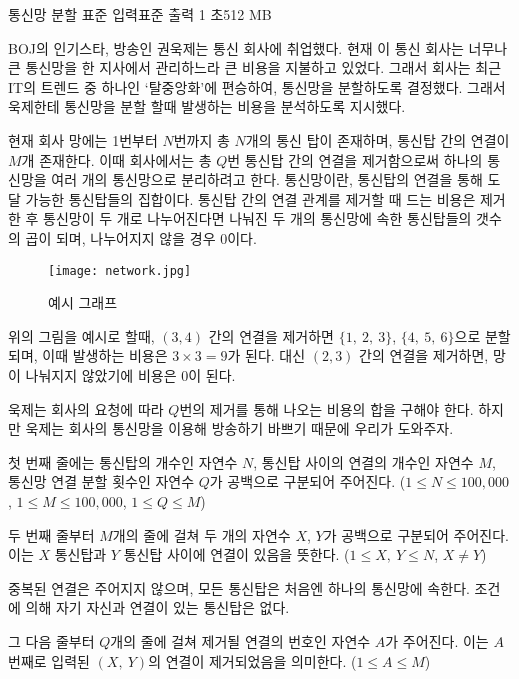 \begin{problem}{통신망 분할}
    {표준 입력}{표준 출력}
    {1 초}{512 MB}{}
    
    BOJ의 인기스타, 방송인 권욱제는 통신 회사에 취업했다. 현재 이 통신 회사는 너무나 큰 통신망을 한 지사에서 관리하느라 큰 비용을 지불하고 있었다. 그래서 회사는 최근 IT의 트렌드 중 하나인 `탈중앙화'에 편승하여, 통신망을 분할하도록 결정했다. 그래서 욱제한테 통신망을 분할 할때 발생하는 비용을 분석하도록 지시했다.

    현재 회사 망에는 1번부터 $ N $번까지 총 $ N $개의 통신 탑이 존재하며, 통신탑 간의 연결이 $ M $개 존재한다. 이때 회사에서는 총 $ Q $번 통신탑 간의 연결을 제거함으로써 하나의 통신망을 여러 개의 통신망으로 분리하려고 한다. 통신망이란, 통신탑의 연결을 통해 도달 가능한 통신탑들의 집합이다. 통신탑 간의 연결 관계를 제거할 때 드는 비용은 제거한 후 통신망이 두 개로 나누어진다면 나눠진 두 개의 통신망에 속한 통신탑들의 갯수의 곱이 되며, 나누어지지 않을 경우 0이다.
    
    \begin{figure}[h]
        \centering
        \texttt{[image: network.jpg]}
        \caption{예시 그래프}
    \end{figure}

    위의 그림을 예시로 할때, $ (3, 4)$ 간의 연결을 제거하면 $ \{1,\ 2,\ 3\} $, $ \{4,\ 5,\ 6\} $으로 분할 되며, 이때 발생하는 비용은 $ 3 \times 3 = 9 $가 된다. 대신 $ (2, 3) $ 간의 연결을 제거하면, 망이 나눠지지 않았기에 비용은 0이 된다.

    욱제는 회사의 요청에 따라 $ Q $번의 제거를 통해 나오는 비용의 합을 구해야 한다. 하지만 욱제는 회사의 통신망을 이용해 방송하기 바쁘기 때문에 우리가 도와주자.
    
    \InputFile
    
    첫 번째 줄에는 통신탑의 개수인 자연수 $ N $, 통신탑 사이의 연결의 개수인 자연수 $ M $, 통신망 연결 분할 횟수인 자연수 $ Q $가 공백으로 구분되어 주어진다. ($ 1 \leq N \leq 100,000 $, $ 1 \leq M \leq 100,000 $, $ 1 \leq Q \leq M $)
    
    두 번째 줄부터 $ M $개의 줄에 걸쳐 두 개의 자연수 $ X $, $ Y $가 공백으로 구분되어 주어진다. 이는 $ X $ 통신탑과 $ Y $ 통신탑 사이에 연결이 있음을 뜻한다. ($ 1 \leq X,\ Y \leq N $, $ X \neq Y $)
    
    중복된 연결은 주어지지 않으며, 모든 통신탑은 처음엔 하나의 통신망에 속한다. 조건에 의해 자기 자신과 연결이 있는 통신탑은 없다.
    
    그 다음 줄부터 $ Q $개의 줄에 걸쳐 제거될 연결의 번호인 자연수 $ A $가 주어진다. 이는 $ A $번째로 입력된 $ (X,\ Y) $의 연결이 제거되었음을 의미한다. ($ 1 \leq A \leq M $)
    

\end{problem}

